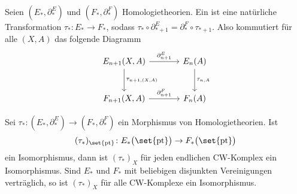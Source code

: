 \begin{definition}[{name=[Morphismus von Homologietheorien]}]
	Seien $(E_*,\partial_*^E)$ und $(F_*,\partial_*^F)$ Homologietheorien. 
	Ein  ist eine natürliche Transformation $\tau_* \colon E_* \to F_*$, sodass $\tau_* \circ \partial_{*+1}^E = \partial_*^F \circ \tau_{*+1}$. 
	Also kommutiert für alle $(X,A)$ das folgende Diagramm
	\[
		\begin{tikzcd}[sep=large]
			E_{n+1}(X,A) \rar["\partial_{n+1}^E"] \dar["\tau_{n+1,(X,A)}"] & E_n(A) \dar["\tau_{n,A}"] \\
			F_{n+1}(X,A) \rar["\partial_{n+1}^F"] & F_n(A)
		\end{tikzcd}
	\]
\end{definition}

\begin{satz}[{name=[{Isomorphie der Homologie von CW-Komplexen von zwei Homologietheorien}]}]
	Sei $\tau_* \colon (E_*,\partial_*^E) \to (F_*,\partial_*^F)$ ein Morphismus von Homologietheorien. Ist 
	\[
		(\tau_*)_{\set{\mathrm{pt}}} \colon E_*\enbrace[\big]{\set{\mathrm{pt}}} \to F_* \enbrace[\big]{\set{\mathrm{pt}}}
	\]
	ein Isomorphismus, dann ist $(\tau_*)_X$ für jeden endlichen CW-Komplex ein Isomorphismus. 
	Sind $E_*$ und $F_*$ mit beliebigen disjunkten Vereinigungen verträglich, so ist $(\tau_*)_X$ für alle CW-Komplexe ein Isomorphismus.
\end{satz}
